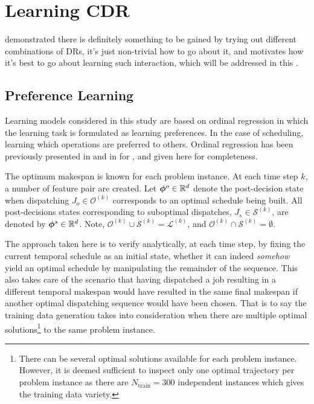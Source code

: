 \documentclass[smallextended]{svjour3}
\begin{document}

\section{Learning CDR}\label{ch:expr:CDR}
 demonstrated there is definitely something to be gained by
trying out different combinations of DRs, it's just non-trivial how to go about 
it, and motivates how it's best to go about learning such interaction, which 
will be addressed in this .

\subsection{Preference Learning}\label{sec:liblinear}
Learning models considered in this study are based on ordinal regression in 
which the learning task is formulated as learning preferences. In the case of 
scheduling, learning which operations are preferred to others. Ordinal 
regression has been previously presented in \cite{Ru06:PPSN} and in 
\cite{InRu11a} for \JSP, and given here for completeness. 

The optimum makespan is known for each problem instance. At each time step $k$, 
a number of feature pair are created. 
Let $\bm{\phi}^{o}\in{\mathbb R}^d$ denote the post-decision state when dispatching 
$J_o\in\mathcal{O}^{(k)}$ corresponds to an optimal schedule being built. 
All post-decisions states corresponding to suboptimal dispatches, 
$J_s\in\mathcal{S}^{(k)}$, are denoted by $\bm{\phi}^{s}\in{\mathbb R}^d$.
Note, \mbox{$\mathcal{O}^{(k)}\cup\mathcal{S}^{(k)}=\mathcal{L}^{(k)}$}, and 
\mbox{$\mathcal{O}^{(k)}\cap\mathcal{S}^{(k)}=\emptyset$}.

The approach taken here is to verify analytically, at each time step, by fixing 
the current temporal schedule as an initial state, whether it can indeed 
\emph{somehow} yield an optimal schedule by manipulating the remainder of the 
sequence. This also takes care of the scenario that having dispatched a job 
resulting in a different temporal makespan would have resulted in the same 
final makespan if another optimal dispatching sequence would have been chosen. 
That is to say the training data generation takes into consideration when there 
are multiple optimal solutions\footnote{
  There can be several optimal solutions available for each problem instance. 
  However, it is deemed sufficient to inspect only one optimal trajectory per 
  problem instance as there are $N_{\text{train}}=300$ independent instances 
  which gives the training data variety.} 
to the same problem instance. 
\end{document}
